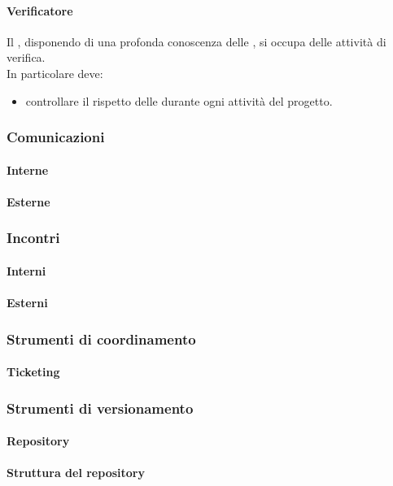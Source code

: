  \paragraph{Verificatore}
 Il \VER , disponendo di una profonda conoscenza delle \NPdoc , si occupa delle attività di verifica. \\
 In particolare deve: 
 \begin{itemize}
  \item controllare il rispetto delle \NPdoc durante ogni attività del progetto.
 \end{itemize} 
\subsubsection{Comunicazioni}
 \paragraph{Interne}
 \paragraph{Esterne}
\subsubsection{Incontri}
 \paragraph{Interni}
 \paragraph{Esterni} 
\subsubsection{Strumenti di coordinamento}
 \paragraph{Ticketing}
\subsubsection{Strumenti di versionamento}
 \paragraph{Repository}
 \paragraph{Struttura del repository}
